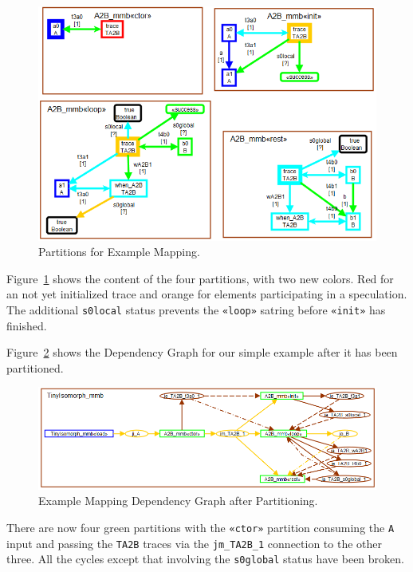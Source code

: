 \documentclass{jot}
\begin{document}
\begin{figure}[h]
	\centering
	\includegraphics[width=1.0\textwidth]{TinyIsomorphPartitions.png}
	\caption{Partitions for Example Mapping.}
	\label{fig:TinyIsomorphPartitions}
\end{figure}

Figure~\ref{fig:TinyIsomorphPartitions} shows the content of the four partitions, with two new colors. Red for an not yet initialized trace and orange for elements participating in a speculation. The additional \verb|s0local| status prevents the \verb|«loop»| satring before \verb|«init»| has finished.

Figure~\ref{fig:TinyIsomorphPostPartition} shows the Dependency Graph for our simple example after it has been partitioned.

\begin{figure}[h]
	\centering
	\includegraphics[width=1.0\textwidth]{TinyIsomorphPostPartition.png}
	\caption{Example Mapping Dependency Graph after Partitioning.}
	\label{fig:TinyIsomorphPostPartition}
\end{figure}

There are now four green partitions with the \verb|«ctor»| partition consuming the \verb|A| input and passing the \verb|TA2B| traces via the \verb|jm_TA2B_1| connection to the other three. All the cycles except that involving the \verb|s0global| status have been broken.
\end{document}
